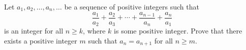 Let $a_1,a_2,\ldots,a_n,\ldots$ be a sequence of positive integers such that
\[
\frac{a_1}{a_2}+\frac{a_2}{a_3}+\cdots+\frac{a_{n-1}}{a_n}+\frac{a_n}{a_1}
\]
is an integer for all $n\geq k$, where $k$ is some positive integer. Prove that there exists a positive integer $m$ such that $a_n=a_{n+1}$ for all $n\geq m$.
